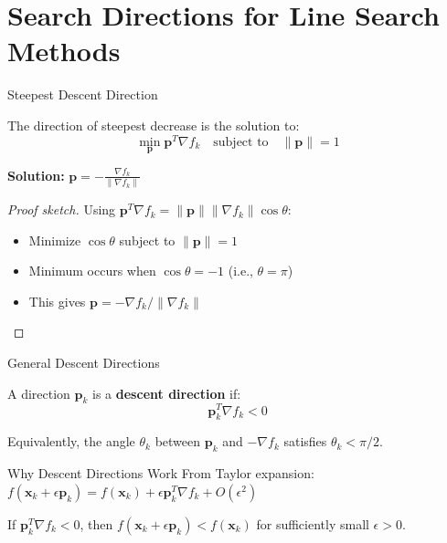 \documentclass[aspectratio=1610]{beamer}
\begin{document}
\section{Search Directions for Line Search Methods}

\begin{frame}{Steepest Descent Direction}
  \begin{theorem}
    The direction of steepest decrease is the solution to:
    $$\min_{\mathbf{p}} \mathbf{p}^T \nabla f_k \quad \text{subject to} \quad \|\mathbf{p}\| = 1$$
    
    \textbf{Solution:} $\mathbf{p} = -\frac{\nabla f_k}{\|\nabla f_k\|}$
  \end{theorem}
  
  \vspace{0.3cm}
  
  \begin{proof}[Proof sketch]
    Using $\mathbf{p}^T \nabla f_k = \|\mathbf{p}\| \|\nabla f_k\| \cos \theta$:
    \begin{itemize}
      \item Minimize $\cos \theta$ subject to $\|\mathbf{p}\| = 1$
      \item Minimum occurs when $\cos \theta = -1$ (i.e., $\theta = \pi$)
      \item This gives $\mathbf{p} = -\nabla f_k / \|\nabla f_k\|$
    \end{itemize}
  \end{proof}
\end{frame}

\begin{frame}{General Descent Directions}
  \begin{definition}
    A direction $\mathbf{p}_k$ is a \textbf{descent direction} if:
    $$\mathbf{p}_k^T \nabla f_k < 0$$
    
    Equivalently, the angle $\theta_k$ between $\mathbf{p}_k$ and $-\nabla f_k$ satisfies $\theta_k < \pi/2$.
  \end{definition}
  
  \vspace{0.3cm}
  
  \begin{block}{Why Descent Directions Work}
    From Taylor expansion: $f(\mathbf{x}_k + \epsilon \mathbf{p}_k) = f(\mathbf{x}_k) + \epsilon \mathbf{p}_k^T \nabla f_k + O(\epsilon^2)$
    
    If $\mathbf{p}_k^T \nabla f_k < 0$, then $f(\mathbf{x}_k + \epsilon \mathbf{p}_k) < f(\mathbf{x}_k)$ for sufficiently small $\epsilon > 0$.
  \end{block}
\end{frame}
\end{document}
